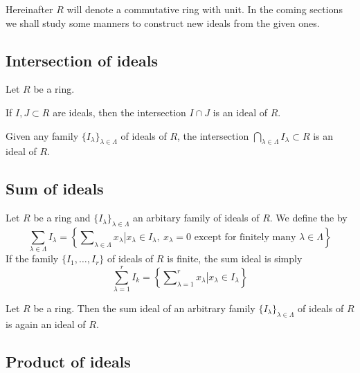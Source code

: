 Hereinafter $R$ will denote a commutative ring with unit. In the coming sections we shall study some manners to construct new ideals from the given ones.

\subsection{Intersection of ideals}

\begin{prop}
	Let $R$ be a ring.
	\begin{enumerateprop}
		\item If $I, J \subset R$ are ideals, then the intersection $I \cap J$ is an ideal of $R$.
		\item Given any family $\{ I_\lambda \}_{\lambda \in \Lambda}$ of ideals of $R$, the intersection $\bigcap_{\lambda \in \Lambda} I_\lambda \subset R$ is an ideal of $R$.
	\end{enumerateprop}
\end{prop}

\subsection{Sum of ideals}

\begin{definition}
	Let $R$ be a ring and $\{ I_\lambda \}_{\lambda \in \Lambda}$ an arbitary family of ideals of $R$. We define the  by
	\[
		\sum_{\lambda \in \Lambda} I_\lambda = 
		\left\{ 
			\sum\nolimits_{\lambda \in \Lambda} x_\lambda
			\left\lvert
			x_\lambda \in I_\lambda, \ x_\lambda = 0 \text{ except for finitely many } \lambda \in \Lambda
			\right.
		\right\}
	\]
	If the family $\{ I_1, \ldots, I_r \}$ of ideals of $R$ is finite, the sum ideal is simply
	\[
		\sum_{\lambda = 1}^r I_k = 
		\left\{ 
		\sum\nolimits_{\lambda = 1}^r x_\lambda
		\left\lvert
		x_\lambda \in I_\lambda
		\right.
		\right\}
	\]
\end{definition}

\begin{prop}
	Let $R$ be a ring. Then the sum ideal of an arbitrary family $\{ I_\lambda \}_{\lambda \in \Lambda}$ of ideals of $R$ is again an ideal of $R$.
\end{prop}


\subsection{Product of ideals}

